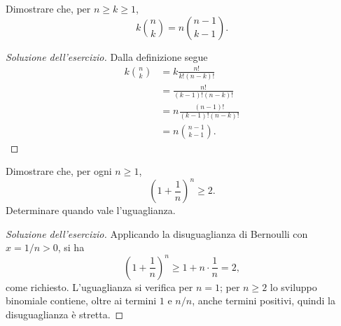 \begin{exercise}
\label{ex:fondamenti-identita-coefficienti-binomiali}
Dimostrare che, per $n\ge k\ge1$,
\[
  k\binom{n}{k}=n\binom{n-1}{k-1}.
\]
\end{exercise}
\begin{proof}[Soluzione dell'esercizio]
Dalla definizione segue
\[
\begin{aligned}
  k\binom{n}{k}
    &=k\frac{n!}{k!(n-k)!}\\
    &=\frac{n!}{(k-1)!(n-k)!}\\
    &=n\frac{(n-1)!}{(k-1)!(n-k)!}\\
    &=n\binom{n-1}{k-1}.
\end{aligned}
\]
\end{proof}

\begin{exercise}
\label{ex:fondamenti-bernoulli-stima}
Dimostrare che, per ogni $n\ge1$,
\[
  \left(1+\frac1n\right)^n\ge2.
\]
Determinare quando vale l'uguaglianza.
\end{exercise}
\begin{proof}[Soluzione dell'esercizio]
Applicando la disuguaglianza di Bernoulli con $x=1/n>0$, si ha
\[
  \left(1+\frac1n\right)^n
  \ge 1+n\cdot\frac1n=2,
\]
come richiesto. L'uguaglianza si verifica per $n=1$; per $n\ge2$
lo sviluppo binomiale contiene, oltre ai termini $1$ e $n/n$,
anche termini positivi, quindi la disuguaglianza è stretta.
\end{proof}

\clearpage


